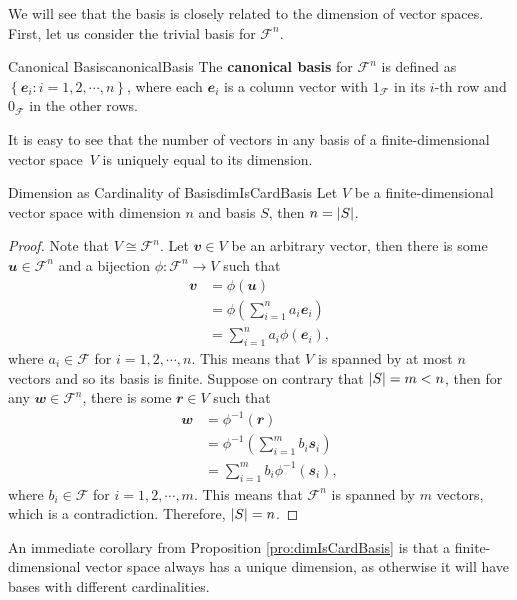 \documentclass[math, code]{amznotes}
\theoremstyle{remark}
\begin{document}
We will see that the basis is closely related to the dimension of vector spaces. First, let us consider the trivial basis for $\mathcal{F}^n$.
\begin{dfnbox}{Canonical Basis}{canonicalBasis}
    The {\color{red} \textbf{canonical basis}} for $\mathcal{F}^n$ is defined as $\left\{\mathbfit{e}_i \colon i = 1, 2, \cdots, n\right\}$, where each $\mathbfit{e}_i$ is a column vector with $1_{\mathcal{F}}$ in its $i$-th row and $0_{\mathcal{F}}$ in the other rows.
\end{dfnbox}
It is easy to see that the number of vectors in any basis of a finite-dimensional vector space~$V$ is uniquely equal to its dimension.
\begin{probox}{Dimension as Cardinality of Basis}{dimIsCardBasis}
    Let $V$ be a finite-dimensional vector space with dimension $n$ and basis $S$, then $n = {\left\lvert {S} \right\rvert}$.
    \tcblower
    \begin{proof}
        Note that $V \cong \mathcal{F}^n$. Let $\mathbfit{v} \in V$ be an arbitrary vector, then there is some~$\mathbfit{u} \in \mathcal{F}^n$ and a bijection $\phi \colon \mathcal{F}^n \to V$ such that 
        \begin{align*}
            \mathbfit{v} & = \phi(\mathbfit{u}) \\
            & = \phi\left(\sum_{i = 1}^{n}a_i\mathbfit{e}_i\right) \\
            & = \sum_{i = 1}^{n}a_i\phi(\mathbfit{e}_i),
        \end{align*}
        where $a_i \in \mathcal{F}$ for $i = 1, 2, \cdots, n$. This means that $V$ is spanned by at most $n$ vectors and so its basis is finite. Suppose on contrary that ${\left\lvert {S} \right\rvert} = m < n$, then for any $\mathbfit{w} \in \mathcal{F}^n$, there is some $\mathbfit{r} \in V$ such that
        \begin{align*}
            \mathbfit{w} & = \phi^{-1}(\mathbfit{r}) \\
            & = \phi^{-1}\left(\sum_{i = 1}^{m}b_i\mathbfit{s}_i\right) \\
            & = \sum_{i = 1}^{m}b_i\phi^{-1}(\mathbfit{s}_i),
        \end{align*}
        where $b_i \in \mathcal{F}$ for $i = 1, 2, \cdots, m$. This means that $\mathcal{F}^n$ is spanned by $m$ vectors, which is a contradiction. Therefore, ${\left\lvert {S} \right\rvert} = n$.
    \end{proof}
\end{probox}
An immediate corollary from Proposition \ref{pro:dimIsCardBasis} is that a finite-dimensional vector space always has a unique dimension, as otherwise it will have bases with different cardinalities.
\end{document}
